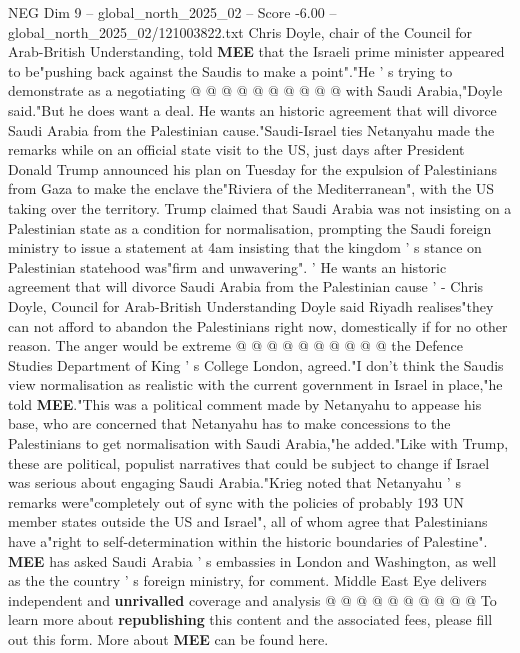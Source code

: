 \begin{textsample}{NEG Dim 9 – global\_north\_2025\_02 – Score -6.00 – global\_north\_2025\_02/121003822.txt}
Chris Doyle, chair of the Council for Arab-British Understanding, told \textbf{MEE} that the Israeli prime minister appeared to be"pushing back against the Saudis to make a point"."He ' s trying to demonstrate as a negotiating @ @ @ @ @ @ @ @ @ @ with Saudi Arabia,"Doyle said."But he does want a deal.
He wants an historic agreement that will divorce Saudi Arabia from the Palestinian cause."Saudi-Israel ties Netanyahu made the remarks while on an official state visit to the US, just days after President Donald Trump announced his plan on Tuesday for the expulsion of Palestinians from Gaza to make the enclave the"Riviera of the Mediterranean", with the US taking over the territory.
Trump claimed that Saudi Arabia was not insisting on a Palestinian state as a condition for normalisation, prompting the Saudi foreign ministry to issue a statement at 4am insisting that the kingdom ' s stance on Palestinian statehood was"firm and unwavering". ' He wants an historic agreement that will divorce Saudi Arabia from the Palestinian cause ' - Chris Doyle, Council for Arab-British Understanding Doyle said Riyadh realises"they can not afford to abandon the Palestinians right now, domestically if for no other reason.
The anger would be extreme @ @ @ @ @ @ @ @ @ @ the Defence Studies Department of King ' s College London, agreed."I don't think the Saudis view normalisation as realistic with the current government in Israel in place,"he told \textbf{MEE}."This was a political comment made by Netanyahu to appease his base, who are concerned that Netanyahu has to make concessions to the Palestinians to get normalisation with Saudi Arabia,"he added."Like with Trump, these are political, populist narratives that could be subject to change if Israel was serious about engaging Saudi Arabia."Krieg noted that Netanyahu ' s remarks were"completely out of sync with the policies of probably 193 UN member states outside the US and Israel", all of whom agree that Palestinians have a"right to self-determination within the historic boundaries of Palestine". \textbf{MEE} has asked Saudi Arabia ' s embassies in London and Washington, as well as the the country ' s foreign ministry, for comment.
Middle East Eye delivers independent and \textbf{unrivalled} coverage and analysis @ @ @ @ @ @ @ @ @ @ To learn more about \textbf{republishing} this content and the associated fees, please fill out this form.
More about \textbf{MEE} can be found here.

\end{textsample}

